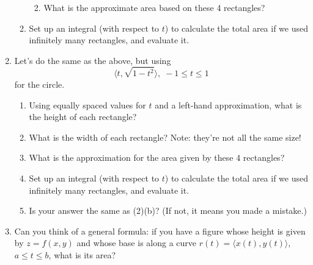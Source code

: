 \documentclass[12pt]{amsart}
\begin{document}
\begin{enumerate}
\begin{enumerate}
\begin{enumerate}
\vspace{0.5in}
\item
What is the approximate area based on these 4 rectangles?

\vspace{.5in}
\end{enumerate}
\item
Set up an integral (with respect to $t$) to calculate the total area if we used infinitely many rectangles, and evaluate it.


\end{enumerate}

\newpage
\item
Let's do the same as the above, but using 
$$\langle t, \sqrt{1-t^2} \rangle, \; -1 \le t \le 1$$
for the circle.
\begin{enumerate}
\item
Using equally spaced values for $t$ and a left-hand approximation, what is the height of each rectangle?

\vspace{.5in}
\item
What is the width of each rectangle?  Note: they're not all the same size!

\vspace{.5in}
\item
What is the approximation for the area given by these 4 rectangles?

\vspace{.5in}
\item
Set up an integral (with respect to $t$) to calculate the total area if we used infinitely many rectangles, and evaluate it.

\vspace{3in}
\item
Is your answer the same as (2)(b)?  (If not, it means you made a mistake.)

\vspace{.35in}
\end{enumerate}

\item
Can you think of a general formula: if you have a figure whose height is given by $z=f(x,y)$ and whose base is along a curve $r(t)= \langle x(t), y(t) \rangle$, $a \le t \le b$, what is its area?
\end{enumerate}
\end{document}
